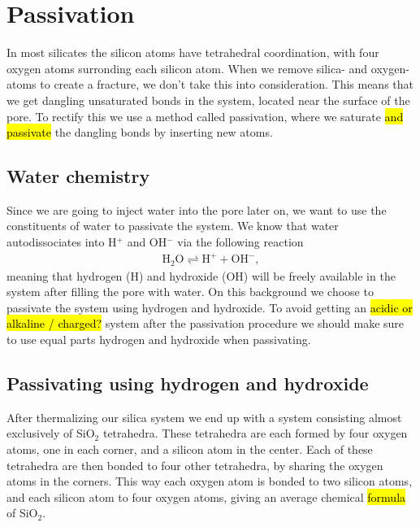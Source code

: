
\section{Passivation}
In most silicates the silicon atoms have tetrahedral coordination, with four oxygen atoms surronding each silicon atom. When we remove silica- and oxygen-atoms to create a fracture, we don't take this into consideration. This means that we get dangling unsaturated bonds in the system, located near the surface of the pore. To rectify this we use a method called passivation, where we saturate \hl{and passivate} the dangling bonds by inserting new atoms. 

\subsection{Water chemistry}
Since we are going to inject water into the pore later on, we want to use the constituents of water to passivate the system. We know that water autodissociates into H$^{+}$ and OH$^{-}$ via the following reaction
\begin{align*}
    \text{H}_2\text{O} \rightleftharpoons \text{H}^{+} + \text{OH}^{-},
\end{align*}
meaning that hydrogen (H) and hydroxide (OH) will be freely available in the system after filling the pore with water. On this background we choose to passivate the system using hydrogen and hydroxide. To avoid getting an \hl{acidic or alkaline / charged?} system after the passivation procedure we should make sure to use equal parts hydrogen and hydroxide when passivating.

\subsection{Passivating using hydrogen and hydroxide}
After thermalizing our silica system we end up with a system consisting almost exclusively of SiO$_2$ tetrahedra. These tetrahedra are each formed by four oxygen atoms, one in each corner, and a silicon atom in the center. Each of these tetrahedra are then bonded to four other tetrahedra, by sharing the oxygen atoms in the corners. This way each oxygen atom is bonded to two silicon atoms, and each silicon atom to four oxygen atoms, giving an average chemical \hl{formula} of SiO$_2$. 

